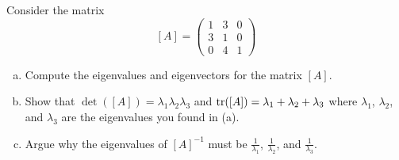\documentclass[12pt]{article} %
\begin{document}
\newpage
\begin{problem}
Consider the matrix
\[
[A]=\begin{pmatrix} 1 & 3 & 0 \\ 3 & 1 & 0 \\
 0 & 4 & 1 \end{pmatrix}
\]
\begin{enumerate}[(a)]
    \item Compute the eigenvalues and eigenvectors for the matrix $[A]$.
    \item Show that $\det([A])=\lambda_1\lambda_2\lambda_3$ and $\mathrm{tr}([A])=\lambda_1 + \lambda_2+\lambda_3$ where $\lambda_1$, $\lambda_2$, and $\lambda_3$ are the eigenvalues you found in (a).
    \item Argue why the eigenvalues of $[A]^{-1}$ must be $\frac{1}{\lambda_1}$, $\frac{1}{\lambda_2}$, and $\frac{1}{\lambda_3}$.
\end{enumerate}
\end{problem}
\end{document}
